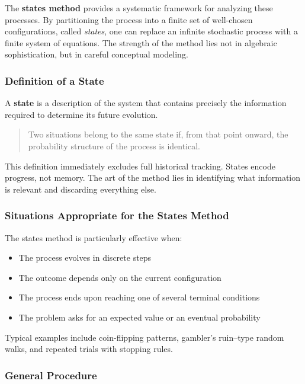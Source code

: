 \documentclass[12pt]{extarticle}
\begin{document}
The \textbf{states method} provides a systematic framework for analyzing these processes. By partitioning the process into a finite set of well-chosen configurations, called \emph{states}, one can replace an infinite stochastic process with a finite system of equations. The strength of the method lies not in algebraic sophistication, but in careful conceptual modeling.

\subsubsection*{Definition of a State}

A \textbf{state} is a description of the system that contains precisely the information required to determine its future evolution.

\begin{quote}
Two situations belong to the same state if, from that point onward, the probability structure of the process is identical.
\end{quote}

This definition immediately excludes full historical tracking. States encode progress, not memory. The art of the method lies in identifying what information is relevant and discarding everything else.

\subsubsection*{Situations Appropriate for the States Method}

The states method is particularly effective when:
\begin{itemize}
    \item The process evolves in discrete steps
    \item The outcome depends only on the current configuration
    \item The process ends upon reaching one of several terminal conditions
    \item The problem asks for an expected value or an eventual probability
\end{itemize}

Typical examples include coin-flipping patterns, gambler's ruin–type random walks, and repeated trials with stopping rules.

\subsubsection*{General Procedure}
\end{document}
